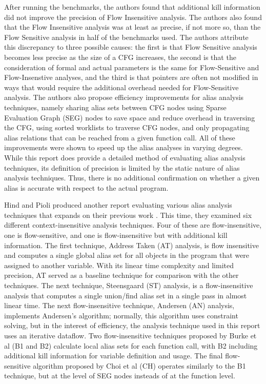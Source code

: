 After running the benchmarks, the authors found that additional kill information did not improve the precision of Flow Insensitive analysis. The authors also found that the Flow Insensitive analysis was at least as precise, if not more so, than the Flow Sensitive analysis in half of the benchmarks used. The authors attribute this discrepancy to three possible causes: the first is that Flow Sensitive analysis becomes less precise as the size of a CFG increases, the second is that the consideration of formal and actual parameters is the same for Flow-Sensitive and Flow-Insenstive analyses, and the third is that pointers are often not modified in ways that would require the additional overhead needed for Flow-Sensitive analysis. The authors also propose efficiency improvements for alias analysis techniques, namely sharing alias sets between CFG nodes using Sparse Evaluation Graph (SEG) nodes to save space and reduce overhead in traversing the CFG, using sorted worklists to traverse CFG nodes, and only propagating alias relations that can be reached from a given function call. All of these improvements were shown to speed up the alias analyses in varying degrees. While this report does provide a detailed method of evaluating alias analysis techniques, its definition of precision is limited by the static nature of alias analysis techniques. Thus, there is no additional confirmation on whether a given alias is accurate with respect to the actual program.

Hind and Pioli produced another report evaluating various alias analysis techniques that expands on their previous work \cite{Hind}. This time, they examined six different context-insensitive analysis techniques. Four of these are flow-insensitive, one is flow-sensitive, and one is flow-insensitive but with additional kill information. The first technique, Address Taken (AT) analysis, is flow insensitive and computes a single global alias set for all objects in the program that were assigned to another variable. With its linear time complexity and limited precision, AT served as a baseline technique for comparison with the other techniques. The next technique, Steensgaard (ST) analysis, is a flow-insensitive analysis that computes a single union/find alias set in a single pass in almost linear time. The next flow-insensitive technique, Andersen (AN) analysis, implements Andersen's algorithm; normally, this algorithm uses constraint solving, but in the interest of efficiency, the analysis technique used in this report uses an iterative dataflow. Two flow-insensitive techniques proposed by Burke et al (B1 and B2) calculate local alias sets for each function call, with B2 including additional kill information for variable definition and usage. The final flow-sensitive algorithm proposed by Choi et al (CH) operates similarly to the B1 technique, but at the level of SEG nodes insteads of at the function level.


